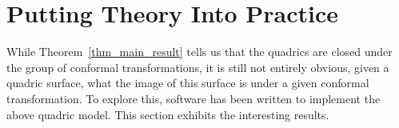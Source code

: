 \documentclass{birkjour}
\theoremstyle{definition}
\theoremstyle{remark}
\numberwithin{equation}{section}
\begin{document}
\section{Putting Theory Into Practice}

While Theorem~\ref{thm_main_result} tells us that the quadrics are
closed under the group of conformal transformations, it is still not
entirely obvious, given a quadric surface, what the image of this
surface is under a given conformal transformation.  To explore this,
software has been written to implement the above quadric model.
This section exhibits the interesting results.



\end{document}
